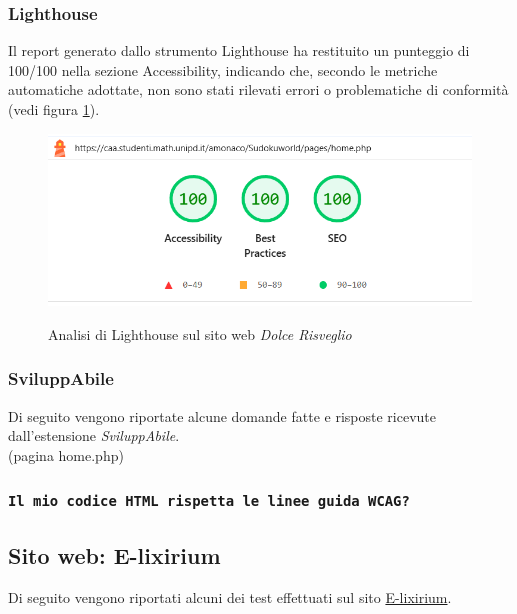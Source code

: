 \subsubsection{Lighthouse}
\noindent Il report generato dallo strumento Lighthouse ha restituito un punteggio di 100/100 nella sezione Accessibility, indicando che, secondo le metriche automatiche adottate, non sono stati rilevati errori o problematiche di conformità (vedi figura \ref{fig:Lighthouse_sudoku}).
\begin{figure}[H]
    \centering
    \includegraphics[width=0.6\linewidth, alt={Screenshot dell'analisi di Lighthouse sul sito web SudokuWorld}]{img/Lighthouse_sudoku.png}
    \caption{Analisi di Lighthouse sul sito web \textit{Dolce Risveglio}}\label{fig:Lighthouse_sudoku}
\end{figure}

\subsubsection{SviluppAbile}
\noindent Di seguito vengono riportate alcune domande fatte e risposte ricevute dall'estensione \textit{SviluppAbile}. \newline
\\ \vspace{-0.5cm}
\noindent(pagina home.php)\\
\subsubsection*{\texttt{Il mio codice HTML rispetta le linee guida WCAG?}}
\begin{adjustwidth}{1cm}{1cm}
\end{adjustwidth}

\subsection{Sito web: E-lixirium}
\noindent Di seguito vengono riportati alcuni dei test effettuati sul sito \href{https://caa.studenti.math.unipd.it/abaldazz/?page=home}{E-lixirium}.

